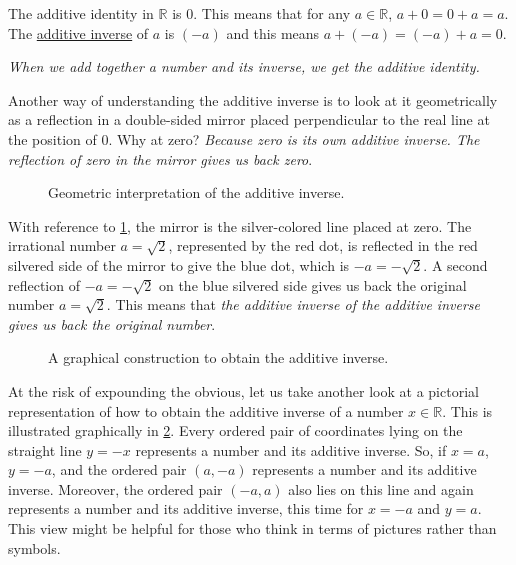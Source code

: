\documentclass[
  a4paper,
]{article}
\begin{document}
The additive identity in \(\mathbb{R}\) is \(0\). This means that for
any \(a \in \mathbb{R}\), \(a + 0 = 0 + a = a\). The
\href{https://en.wikipedia.org/wiki/Additive_inverse}{additive inverse}
of \(a\) is \((-a)\) and this means \(a + (-a) = (-a) + a = 0\).

\emph{When we add together a number and its inverse, we get the additive
identity.}

Another way of understanding the additive inverse is to look at it
geometrically as a reflection in a double-sided mirror placed
perpendicular to the real line at the position of \(0\). Why at zero?
\emph{Because zero is its own additive inverse. The reflection of zero
in the mirror gives us back zero}.

\begin{figure}
\hypertarget{fig:mirror-at-zero}{%
\centering

\caption{Geometric interpretation of the additive
inverse.}\label{fig:mirror-at-zero}
}
\end{figure}

With reference to \cref{fig:mirror-at-zero}, the mirror is the
silver-colored line placed at zero. The irrational number
\(a = \sqrt{2}\), represented by the red dot, is reflected in the red
silvered side of the mirror to give the blue dot, which is
\(-a = -\sqrt{2}\). A second reflection of \(-a = -\sqrt{2}\) on the
blue silvered side gives us back the original number \(a = \sqrt{2}\).
This means that \emph{the additive inverse of the additive inverse gives
us back the original number}.

\begin{figure}
\hypertarget{fig:additive-inverse}{%
\centering

\caption{A graphical construction to obtain the additive
inverse.}\label{fig:additive-inverse}
}
\end{figure}

At the risk of expounding the obvious, let us take another look at a
pictorial representation of how to obtain the additive inverse of a
number \(x \in \mathbb{R}\). This is illustrated graphically in
\cref{fig:additive-inverse}. Every ordered pair of coordinates lying on
the straight line \(y = -x\) represents a number and its additive
inverse. So, if \(x = a\), \(y = -a\), and the ordered pair \((a, -a)\)
represents a number and its additive inverse. Moreover, the ordered pair
\((-a, a)\) also lies on this line and again represents a number and its
additive inverse, this time for \(x = -a\) and \(y = a\). This view
might be helpful for those who think in terms of pictures rather than
symbols.
\end{document}
